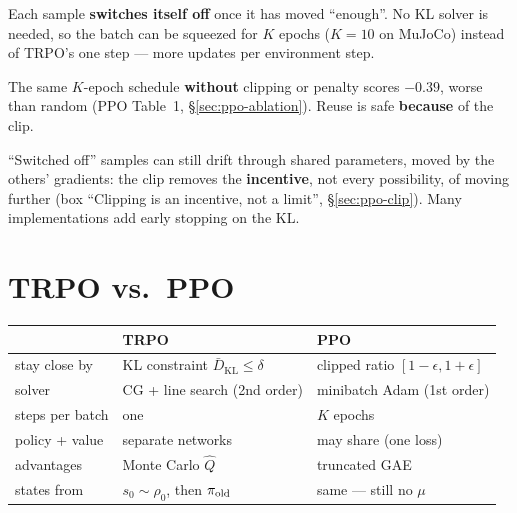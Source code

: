 \begin{keybox}
Each sample \textbf{switches itself off} once it has moved ``enough''. No KL solver is needed, so the batch can be squeezed for $K$ epochs ($K=10$ on MuJoCo) instead of TRPO's one step --- more updates per environment step.
\end{keybox}

\begin{pair}
\begin{slatebox}[title={Evidence: the ablation}]
\small The same $K$-epoch schedule \textbf{without} clipping or penalty scores $-0.39$, worse than random (PPO Table~1, \S\ref{sec:ppo-ablation}). Reuse is safe \textbf{because} of the clip.
\end{slatebox}
\begin{warnbox}[title={Caveat}]
\small ``Switched off'' samples can still drift through shared parameters, moved by the others' gradients: the clip removes the \textbf{incentive}, not every possibility, of moving further (box ``Clipping is an incentive, not a limit'', \S\ref{sec:ppo-clip}). Many implementations add early stopping on the KL.
\end{warnbox}
\end{pair}


\section{TRPO vs.\ PPO}

\begin{center}
\small
\begin{tabular}{l l l}
\toprule
 & \textbf{TRPO} & \textbf{\color{AtlasCool}PPO} \\
\midrule
stay close by & KL constraint $\bar D_{\mathrm{KL}}\le\delta$ & clipped ratio $[1-\epsilon,1+\epsilon]$ \\
solver & CG + line search (2nd order) & minibatch Adam (1st order) \\
steps per batch & one & $K$ epochs \\
policy + value & separate networks & may share (one loss) \\
advantages & Monte Carlo $\hat Q$ & truncated GAE \\
states from & $s_0\sim\rho_0$, then $\pi_{\mathrm{old}}$ & same --- still no $\mu$ \\
\bottomrule
\end{tabular}
\end{center}

